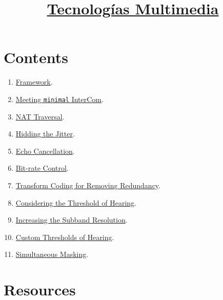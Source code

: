 
\title{\href{https://tecnologias-multimedia.github.io/}{Tecnologías Multimedia}}

\maketitle

\section{Contents}

\begin{enumerate}
\item \href{https://tecnologias-multimedia.github.io/contents/framework/}{Framework}.
\item \href{https://tecnologias-multimedia.github.io/contents/minimal/}{Meeting \texttt{minimal} InterCom}.
\item \href{https://tecnologias-multimedia.github.io/contents/NAT_traversal/}{NAT Traversal}.
\item \href{https://tecnologias-multimedia.github.io/contents/jitter/}{Hidding the Jitter}.
\item \href{https://tecnologias-multimedia.github.io/contents/echo_cancellation/}{Echo Cancellation}.
\item \href{https://tecnologias-multimedia.github.io/contents/BR_control/}{Bit-rate Control}.
\item \href{https://tecnologias-multimedia.github.io/contents/transform_coding/}{Transform Coding for Removing Redundancy}.
\item \href{https://tecnologias-multimedia.github.io/contents/threshold_of_hearing/}{Considering the Threshold of Hearing}.
\item \href{https://tecnologias-multimedia.github.io/contents/high_resolution_ToH/}{Increasing the Subband Resolution}.
\item \href{https://tecnologias-multimedia.github.io/contents/custom_ToH/}{Custom Thresholds of Hearing}.
\item \href{https://tecnologias-multimedia.github.io/contents/simultaneous_masking/}{Simultaneous Masking}.
\end{enumerate}

\section{Resources}


